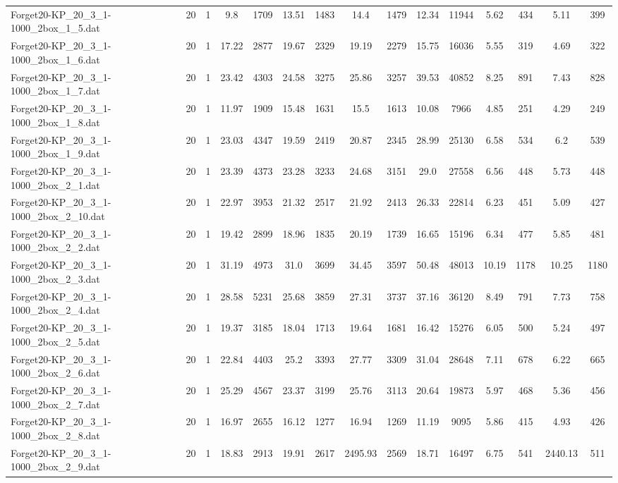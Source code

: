 \begin{table}[!ht]
{\begin{tabular}{lcccccccccccccc}
Forget20-KP\_20\_3\_1-1000\_2box\_1\_5.dat & 20 & 1 & 9.8 & 1709 & 13.51 & 1483 & 14.4 & 1479 & 12.34 & 11944 & 5.62 & 434 & 5.11 & 399 \\
Forget20-KP\_20\_3\_1-1000\_2box\_1\_6.dat & 20 & 1 & 17.22 & 2877 & 19.67 & 2329 & 19.19 & 2279 & 15.75 & 16036 & 5.55 & 319 & 4.69 & 322 \\
Forget20-KP\_20\_3\_1-1000\_2box\_1\_7.dat & 20 & 1 & 23.42 & 4303 & 24.58 & 3275 & 25.86 & 3257 & 39.53 & 40852 & 8.25 & 891 & 7.43 & 828 \\
Forget20-KP\_20\_3\_1-1000\_2box\_1\_8.dat & 20 & 1 & 11.97 & 1909 & 15.48 & 1631 & 15.5 & 1613 & 10.08 & 7966 & 4.85 & 251 & 4.29 & 249 \\
Forget20-KP\_20\_3\_1-1000\_2box\_1\_9.dat & 20 & 1 & 23.03 & 4347 & 19.59 & 2419 & 20.87 & 2345 & 28.99 & 25130 & 6.58 & 534 & 6.2 & 539 \\
Forget20-KP\_20\_3\_1-1000\_2box\_2\_1.dat & 20 & 1 & 23.39 & 4373 & 23.28 & 3233 & 24.68 & 3151 & 29.0 & 27558 & 6.56 & 448 & 5.73 & 448 \\
Forget20-KP\_20\_3\_1-1000\_2box\_2\_10.dat & 20 & 1 & 22.97 & 3953 & 21.32 & 2517 & 21.92 & 2413 & 26.33 & 22814 & 6.23 & 451 & 5.09 & 427 \\
Forget20-KP\_20\_3\_1-1000\_2box\_2\_2.dat & 20 & 1 & 19.42 & 2899 & 18.96 & 1835 & 20.19 & 1739 & 16.65 & 15196 & 6.34 & 477 & 5.85 & 481 \\
Forget20-KP\_20\_3\_1-1000\_2box\_2\_3.dat & 20 & 1 & 31.19 & 4973 & 31.0 & 3699 & 34.45 & 3597 & 50.48 & 48013 & 10.19 & 1178 & 10.25 & 1180 \\
Forget20-KP\_20\_3\_1-1000\_2box\_2\_4.dat & 20 & 1 & 28.58 & 5231 & 25.68 & 3859 & 27.31 & 3737 & 37.16 & 36120 & 8.49 & 791 & 7.73 & 758 \\
Forget20-KP\_20\_3\_1-1000\_2box\_2\_5.dat & 20 & 1 & 19.37 & 3185 & 18.04 & 1713 & 19.64 & 1681 & 16.42 & 15276 & 6.05 & 500 & 5.24 & 497 \\
Forget20-KP\_20\_3\_1-1000\_2box\_2\_6.dat & 20 & 1 & 22.84 & 4403 & 25.2 & 3393 & 27.77 & 3309 & 31.04 & 28648 & 7.11 & 678 & 6.22 & 665 \\
Forget20-KP\_20\_3\_1-1000\_2box\_2\_7.dat & 20 & 1 & 25.29 & 4567 & 23.37 & 3199 & 25.76 & 3113 & 20.64 & 19873 & 5.97 & 468 & 5.36 & 456 \\
Forget20-KP\_20\_3\_1-1000\_2box\_2\_8.dat & 20 & 1 & 16.97 & 2655 & 16.12 & 1277 & 16.94 & 1269 & 11.19 & 9095 & 5.86 & 415 & 4.93 & 426 \\
Forget20-KP\_20\_3\_1-1000\_2box\_2\_9.dat & 20 & 1 & 18.83 & 2913 & 19.91 & 2617 & 2495.93 & 2569 & 18.71 & 16497 & 6.75 & 541 & 2440.13 & 511 \\

\end{tabular}}
\end{table}
